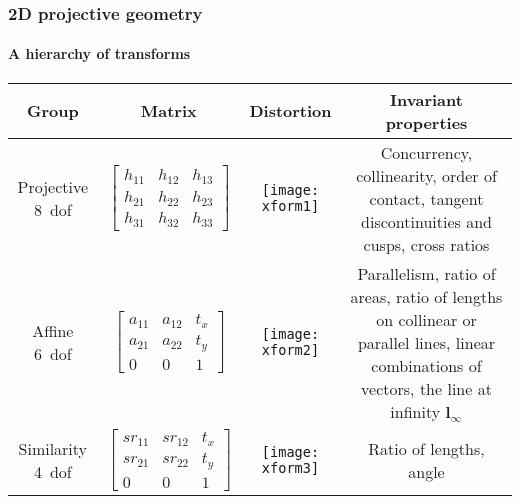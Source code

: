 \documentclass[aspectratio=169]{beamer}
\renewcommand{\vec}[1]{\boldsymbol{#1}}
\begin{document}
\begin{frame}
\frametitle{2D projective geometry}
\framesubtitle{A hierarchy of transforms}

{\small
\begin{tabular}{cccc}
\hline
\hline
Group & Matrix & Distortion & Invariant properties \\
\hline
\begin{minipage}{0.5in} Projective 8~dof \end{minipage} &
$\begin{bmatrix}h_{11} & h_{12} & h_{13} \\
                h_{21} & h_{22} & h_{23} \\
                h_{31} & h_{32} & h_{33} \end{bmatrix}$ &
\parbox{0.5in}{\centerline{\texttt{[image: xform1]}}} &
\begin{minipage}{1.8in} Concurrency, collinearity, order of contact,
  tangent discontinuities and cusps, cross ratios \end{minipage} \\
\hline
\begin{minipage}{0.5in} Affine 6~dof \end{minipage} &
$\begin{bmatrix}a_{11} & a_{12} & t_x \\
                a_{21} & a_{22} & t_y \\
                0 & 0 & 1 \end{bmatrix}$ &
\parbox{0.5in}{\centerline{\texttt{[image: xform2]}}} &
\begin{minipage}{1.8in} Parallelism, ratio of areas, ratio of lengths
  on collinear or parallel lines, linear combinations of vectors, the
  line at infinity $\vec{l}_{\infty}$\end{minipage} \\
\hline
\begin{minipage}{0.5in} Similarity 4~dof \end{minipage} &
$\begin{bmatrix}sr_{11} & sr_{12} & t_x \\
                sr_{21} & sr_{22} & t_y \\
                0 & 0 & 1 \end{bmatrix}$ &
\parbox{0.5in}{\centerline{\texttt{[image: xform3]}}} &
\begin{minipage}{1.8in} Ratio of lengths, angle \end{minipage} \\

\end{tabular}}
\end{frame}
\end{document}
